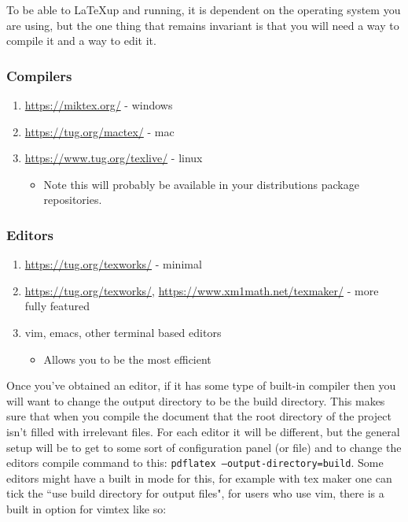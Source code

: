 To be able to \LaTeX up and running, it is dependent on the operating system you are using, but the one thing that remains invariant is that you will need a way to compile it and a way to edit it.


\subsubsection*{Compilers}
\begin{enumerate}
    \item \url{https://miktex.org/} - windows
    \item \url{https://tug.org/mactex/} - mac
    \item \url{https://www.tug.org/texlive/} - linux 
    \begin{itemize}
        \item Note this will probably be available in your distributions package repositories.
    \end{itemize}
\end{enumerate}

\subsubsection*{Editors}
\begin{enumerate}
   \item \url{https://tug.org/texworks/} - minimal
   \item \url{https://tug.org/texworks/}, \url{https://www.xm1math.net/texmaker/} - more fully featured
    \item vim, emacs, other terminal based editors
    \begin{itemize}
        \item Allows you to be the most efficient
    \end{itemize}
\end{enumerate}

Once you've obtained an editor, if it has some type of built-in compiler then you will want to change the output directory to be the build directory. This makes sure that when you compile the document that the root directory of the project isn't filled with irrelevant files. For each editor it will be different, but the general setup will be to get to some sort of configuration panel (or file) and to change the editors compile command to this: \texttt{pdflatex --output-directory=build}. Some editors might have a built in mode for this, for example with tex maker one can tick the ``use build directory for output files", for users who use vim, there is a built in option for vimtex like so:


